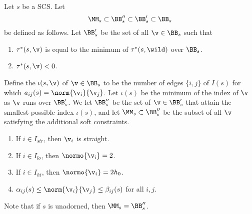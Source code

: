 \begin{definition}
Let $s$ be a SCS.
Let 
\[
\MM_{s}\subset \BB''_{s}\subset \BB'_s\subset \BB_{s}
\]
be defined as follows.
Let $\BB'_{s}$ be the set of all $\v\in \BB_{s}$ such that
\begin{enumerate}
\item $\tau^*(s,\v)$ is equal to the minimum of $\tau^*(s,\wild)$ over $\BB_{s}$.
\item $\tau^*(s,\v)< 0$.
\end{enumerate}
Define the  $\iota(s,\v)$ of $\v\in \BB_s$ to be the number of edges $\{i,j\}$ of $I(s)$
for which $a_{i j}(s)=\norm{\v_i}{\v_j}$.  Let $\iota(s)$ be the minimum
of the index of $\v$ as $\v$ runs over $\BB'_s$.  
We let $\BB''_{s}$  be the set of $\v\in \BB'_{s}$ that attain
the smallest possible index $\iota(s)$,
and let $\MM_s\subset \BB''_s$ be the subset of all $\v$ satisfying the additional soft
constraints.
\begin{enumerate}
\item If $i\in I_{str}$,  then $\v_i$ is straight.
\item If $i\in I_{lo}$,  then $\normo{\v_i}=2$.
\item If $i\in I_{hi}$,  then $\normo{\v_i}=2h_0$.
\item $\alpha_{ij}(s)\le \norm{\v_i}{\v_j}\le \beta_{ij}(s)$ for all $i,j$.
\end{enumerate}
\end{definition}


Note that if $s$ is unadorned, then $\MM_s = \BB''_s$.







